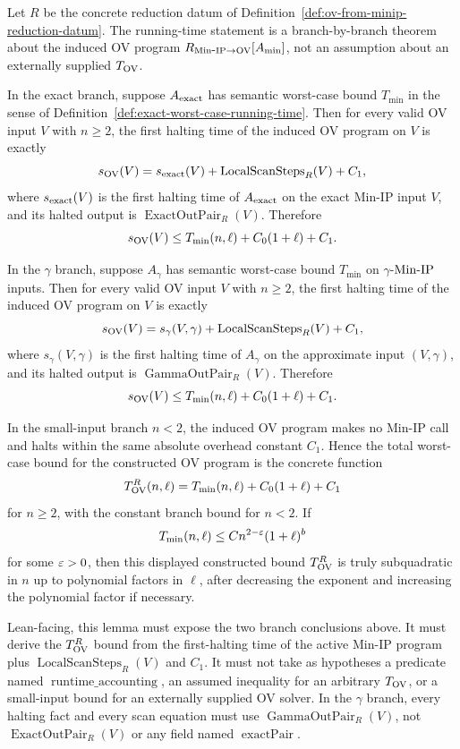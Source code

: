\begin{lemma}
  \label{lem:ov-from-minip-running-time}
  Let $R$ be the concrete reduction datum of
  Definition~\ref{def:ov-from-minip-reduction-datum}.  The running-time
  statement is a branch-by-branch theorem about the induced OV program
  $R_{\mathrm{Min\mbox{-}IP}\to\mathrm{OV}}[A_{\min}]$, not an assumption about an externally supplied
  $T_{\mathrm{OV}}$.

  In the exact branch, suppose $A_{\rm exact}$ has semantic worst-case bound
  $T_{\min}$ in the sense of
  Definition~\ref{def:exact-worst-case-running-time}.  Then for every valid OV
  input $V$ with $n\geq2$, the first halting time of the induced OV program on
  $V$ is exactly
  \[
    s_{\mathrm{OV}}(V)
      =
    s_{\rm exact}(V)
      +\operatorname{LocalScanSteps}_R(V)+C_1,
  \]
  where $s_{\rm exact}(V)$ is the first halting time of $A_{\rm exact}$ on the
  exact Min-IP input $V$, and its halted output is
  $\operatorname{ExactOutPair}_R(V)$.  Therefore
  \[
    s_{\mathrm{OV}}(V)
      \leq
    T_{\min}(n,\ell)+C_0(1+\ell)+C_1 .
  \]

  In the $\gamma$ branch, suppose $A_{\gamma}$ has semantic worst-case bound
  $T_{\min}$ on $\gamma$-$\mathrm{Min\mbox{-}IP}$ inputs.  Then for every valid OV input $V$
  with $n\geq2$, the first halting time of the induced OV program on $V$ is
  exactly
  \[
    s_{\mathrm{OV}}(V)
      =
    s_{\gamma}(V,\gamma)
      +\operatorname{LocalScanSteps}_R(V)+C_1,
  \]
  where $s_{\gamma}(V,\gamma)$ is the first halting time of $A_{\gamma}$ on
  the approximate input $(V,\gamma)$, and its halted output is
  $\operatorname{GammaOutPair}_R(V)$.  Therefore
  \[
    s_{\mathrm{OV}}(V)
      \leq
    T_{\min}(n,\ell)+C_0(1+\ell)+C_1 .
  \]

  In the small-input branch $n<2$, the induced OV program makes no Min-IP
  call and halts within the same absolute overhead constant $C_1$.  Hence the
  total worst-case bound for the constructed OV program is the concrete
  function
  \[
    T_{\mathrm{OV}}^R(n,\ell)=T_{\min}(n,\ell)+C_0(1+\ell)+C_1
  \]
  for $n\geq2$, with the constant branch bound for $n<2$.  If
  \[
    T_{\min}(n,\ell)\leq C n^{2-\varepsilon}(1+\ell)^b
  \]
  for some $\varepsilon>0$, then this displayed constructed bound
  $T_{\mathrm{OV}}^R$ is truly subquadratic in $n$ up to polynomial factors in $\ell$,
  after decreasing the exponent and increasing the polynomial factor if
  necessary.

  Lean-facing, this lemma must expose the two branch conclusions above.  It
  must derive the $T_{\mathrm{OV}}^R$ bound from the first-halting time of the active
  Min-IP program plus $\operatorname{LocalScanSteps}_R(V)$ and $C_1$.  It
  must not take as hypotheses a predicate named
  $\operatorname{runtime\_accounting}$, an assumed inequality for an arbitrary
  $T_{\mathrm{OV}}$, or a small-input bound for an externally supplied OV solver.
  In the $\gamma$ branch, every halting fact and every scan equation must use
  $\operatorname{GammaOutPair}_R(V)$, not
  $\operatorname{ExactOutPair}_R(V)$ or any field named
  $\operatorname{exactPair}$.
\end{lemma}
